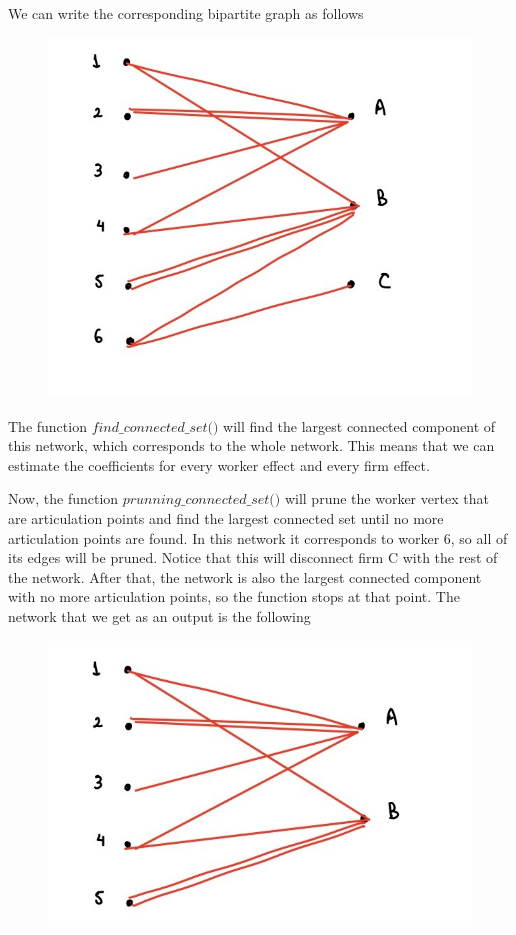 \documentclass[12pt]{article}
\begin{document}
We can write the corresponding bipartite graph as follows
\begin{figure}[h!]
    \centering
\includegraphics[scale=0.7]{minimal_unit.png}    \end{figure}

The function $\textit{find\_connected\_set()}$ will find the largest connected component of this network, which corresponds to the whole network. This means that we can estimate the coefficients for every worker effect and every firm effect. 

Now, the function $\textit{prunning\_connected\_set()}$ will prune the worker vertex that are articulation points and find the largest connected set until no more articulation points are found. In this network it corresponds to worker 6, so all of its edges will be pruned. Notice that this will disconnect firm C with the rest of the network. After that, the network is also the largest connected component with no more articulation points, so the function stops at that point. The network that we get as an output is the following

\begin{figure}[h!]
    \centering
\includegraphics[scale=0.7]{pruning.png}    
\end{figure}
\end{document}

